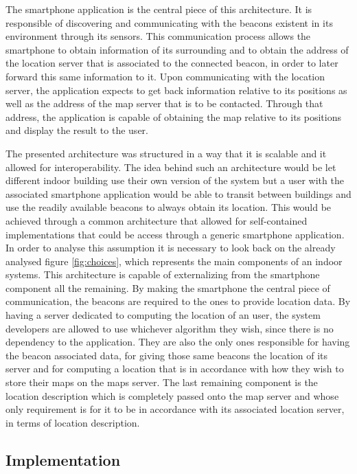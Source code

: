 \documentclass[a4paper]{IEEEtran}
\begin{document}
The smartphone application is the central piece of this architecture. It is responsible of discovering and communicating with the beacons existent in its environment through its sensors. This communication process allows the smartphone to obtain information of its surrounding and to obtain the address of the location server that is associated to the connected beacon, in order to later forward this same information to it. Upon communicating with the location server, the application expects to get back information relative to its positions as well as the address of the map server that is to be contacted. Through that address, the application is capable of obtaining the map relative to its positions and display the result to the user.

The presented architecture was structured in a way that it is scalable and it allowed for interoperability. The idea behind such an architecture would be let different indoor building use their own version of the system but a user with the associated smartphone application would be able to transit between buildings and use the readily available beacons to always obtain its location. This would be achieved through a common architecture that allowed for self-contained implementations that could be access through a generic smartphone application. In order to analyse this assumption it is necessary to look back on the already analysed figure \ref{fig:choices}, which represents the main components of an indoor systems. This architecture is capable of externalizing from the smartphone component all the remaining. By making the smartphone the central piece of communication, the beacons are required to the ones to provide location data. By having a server dedicated to computing the location of an user, the system developers are allowed to use whichever algorithm they wish, since there is no dependency to the application. They are also the only ones responsible for having the beacon associated data, for giving those same beacons the location of its server and for computing a location that is in accordance with how they wish to store their maps on the maps server. The last remaining component is the location description which is completely passed onto the map server and whose only requirement is for it to be in accordance with its associated location server, in terms of location description.


\subsection{Implementation}
\label{sec:struture}
\end{document}
